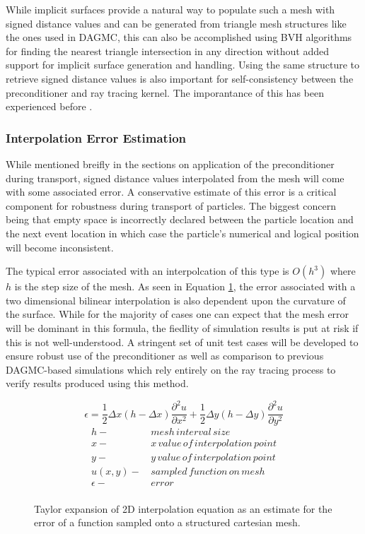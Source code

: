 \documentclass[12pt, a4paper]{article}
\begin{document}
While implicit surfaces provide a natural way to populate such a mesh with signed distance values and can be generated from triangle mesh structures like the ones used in DAGMC, this can also be accomplished using BVH algorithms for finding the nearest triangle intersection in any direction without added support for implicit surface generation and handling. Using the same structure to retrieve signed distance values is also important for self-consistency between the preconditioner and ray tracing kernel. The imporantance of this has been experienced before \cite{Smith_2011}.

\subsubsection{Interpolation Error Estimation}

While mentioned breifly in the sections on application of the preconditioner during transport, signed distance values interpolated from the mesh will come with some associated error. A conservative estimate of this error is a critical component for robustness during transport of particles. The biggest concern being that empty space is incorrectly declared between the particle location and the next event location in which case the particle's numerical and logical position will become inconsistent.

The typical error associated with an interpolcation of this type is $O(h^3)$ where $h$ is the step size of the mesh. As seen in Equation \ref{interpolation_err_2d}, the error associated with a two dimensional bilinear interpolation is also dependent upon the curvature of the surface. While for the majority of cases one can expect that the mesh error will be dominant in this formula, the fiedlity of simulation results is put at risk if this is not well-understood. A stringent set of unit test cases will be developed to ensure robust use of the preconditioner as well as comparison to previous DAGMC-based simulations which rely entirely on the ray tracing process to verify results produced using this method.

\begin{figure}[H]
  \begin{equation}
    \epsilon = \frac{1}{2} \Delta x (h-\Delta x) \frac{\partial^2 u}{\partial x^2} + \frac{1}{2} \Delta y (h-\Delta y)  \frac{\partial^2 u}{\partial y^2}
  \end{equation}
  \begin{align*}
    h - & \, mesh\, interval\, size \\
    x - & \, x\, value\, of\, interpolation\, point \\
    y - & \, y\, value\, of\, interpolation\, point \\
    u(x,y) - &\, sampled\, function\, on\, mesh \\
    \epsilon - & \, error \\
  \end{align*}
  \caption{Taylor expansion of 2D interpolation equation as an estimate for the error of a function sampled onto a structured cartesian mesh.}
  \label{interpolation_err_2d}
\end{figure}
\end{document}
